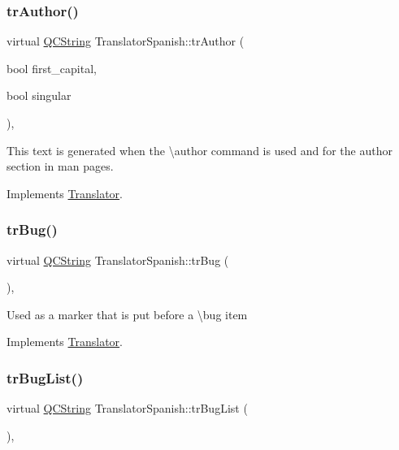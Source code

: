 \subsubsection{\texorpdfstring{trAuthor()}{trAuthor()}}
{\footnotesize\ttfamily virtual \mbox{\hyperlink{class_q_c_string}{Q\+C\+String}} Translator\+Spanish\+::tr\+Author (\begin{DoxyParamCaption}\item[{bool}]{first\+\_\+capital,  }\item[{bool}]{singular }\end{DoxyParamCaption})\hspace{0.3cm}{\ttfamily [inline]}, {\ttfamily [virtual]}}

This text is generated when the \textbackslash{}author command is used and for the author section in man pages. 

Implements \mbox{\hyperlink{class_translator}{Translator}}.

\mbox{\label{class_translator_spanish_a1785c24517a8a04edf0879170125c233}} 
\subsubsection{\texorpdfstring{trBug()}{trBug()}}
{\footnotesize\ttfamily virtual \mbox{\hyperlink{class_q_c_string}{Q\+C\+String}} Translator\+Spanish\+::tr\+Bug (\begin{DoxyParamCaption}{ }\end{DoxyParamCaption})\hspace{0.3cm}{\ttfamily [inline]}, {\ttfamily [virtual]}}

Used as a marker that is put before a \textbackslash{}bug item 

Implements \mbox{\hyperlink{class_translator}{Translator}}.

\mbox{\label{class_translator_spanish_ad95005fd045e63eee3126f81c7d09e39}} 
\subsubsection{\texorpdfstring{trBugList()}{trBugList()}}
{\footnotesize\ttfamily virtual \mbox{\hyperlink{class_q_c_string}{Q\+C\+String}} Translator\+Spanish\+::tr\+Bug\+List (\begin{DoxyParamCaption}{ }\end{DoxyParamCaption})\hspace{0.3cm}{\ttfamily [inline]}, {\ttfamily [virtual]}}


